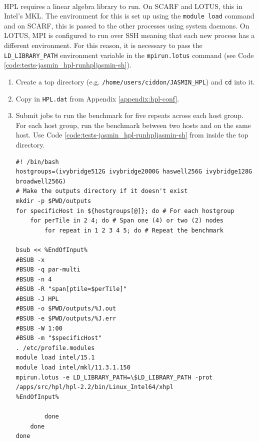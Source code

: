 \documentclass{article}
\newenvironment{code}{\captionsetup{type=listing}}{}
\begin{document}
        \paragraph{}
        HPL requires a linear algebra library to run. On SCARF and LOTUS, this in Intel's MKL. The environment for this is set up using the \texttt{module load} command and on SCARF, this is passed to the other processes using system daemons. On LOTUS, MPI is configured to run over SSH meaning that each new process has a different environment. For this reason, it is necessary to pass the \verb|LD_LIBRARY_PATH| environment variable in the \texttt{mpirun.lotus} command (see Code \ref{code:tests-jasmin_hpl-runhpljasmin-sh}).

        \begin{enumerate}

            \item Create a top directory (e.g. \verb|/home/users/ciddon/JASMIN_HPL|) and \verb|cd| into it.

            \item Copy in \verb|HPL.dat| from Appendix \ref{appendix:hpl-conf}.

            \item Submit jobs to run the benchmark for five repeats across each host group. For each host group, run the benchmark between two hosts and on the same host. Use Code \ref{code:tests-jasmin_hpl-runhpljasmin-sh} from inside the top directory.

            \begin{code}
            \label{code:tests-jasmin_hpl-runhpljasmin-sh}

            \begin{verbatim}
#! /bin/bash
hostgroups=(ivybridge512G ivybridge2000G haswell256G ivybridge128G broadwell256G)
# Make the outputs directory if it doesn't exist
mkdir -p $PWD/outputs
for specificHost in ${hostgroups[@]}; do # For each hostgroup
    for perTile in 2 4; do # Span one (4) or two (2) nodes
        for repeat in 1 2 3 4 5; do # Repeat the benchmark

bsub << %EndOfInput%
#BSUB -x
#BSUB -q par-multi
#BSUB -n 4
#BSUB -R "span[ptile=$perTile]"
#BSUB -J HPL
#BSUB -o $PWD/outputs/%J.out
#BSUB -e $PWD/outputs/%J.err
#BSUB -W 1:00
#BSUB -m "$specificHost"
. /etc/profile.modules
module load intel/15.1
module load intel/mkl/11.3.1.150
mpirun.lotus -e LD_LIBRARY_PATH=\$LD_LIBRARY_PATH -prot /apps/src/hpl/hpl-2.2/bin/Linux_Intel64/xhpl
%EndOfInput%

        done
    done
done
            \end{verbatim}
            \end{code}
        \end{enumerate}
\end{document}

